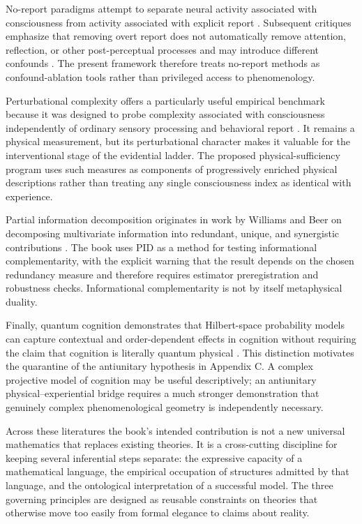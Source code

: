 No-report paradigms attempt to separate neural activity associated with consciousness from activity associated with explicit report \cite{tsuchiya2015NoReport}. Subsequent critiques emphasize that removing overt report does not automatically remove attention, reflection, or other post-perceptual processes and may introduce different confounds \cite{duman2022NoReport}. The present framework therefore treats no-report methods as confound-ablation tools rather than privileged access to phenomenology.

Perturbational complexity offers a particularly useful empirical benchmark because it was designed to probe complexity associated with consciousness independently of ordinary sensory processing and behavioral report \cite{casali2013PCI}. It remains a physical measurement, but its perturbational character makes it valuable for the interventional stage of the evidential ladder. The proposed physical-sufficiency program uses such measures as components of progressively enriched physical descriptions rather than treating any single consciousness index as identical with experience.

Partial information decomposition originates in work by Williams and Beer on decomposing multivariate information into redundant, unique, and synergistic contributions \cite{williams2010PID}. The book uses PID as a method for testing informational complementarity, with the explicit warning that the result depends on the chosen redundancy measure and therefore requires estimator preregistration and robustness checks. Informational complementarity is not by itself metaphysical duality.

Finally, quantum cognition demonstrates that Hilbert-space probability models can capture contextual and order-dependent effects in cognition without requiring the claim that cognition is literally quantum physical \cite{pothos2022QuantumCognition}. This distinction motivates the quarantine of the antiunitary hypothesis in Appendix C. A complex projective model of cognition may be useful descriptively; an antiunitary physical--experiential bridge requires a much stronger demonstration that genuinely complex phenomenological geometry is independently necessary.

Across these literatures the book's intended contribution is not a new universal mathematics that replaces existing theories. It is a cross-cutting discipline for keeping several inferential steps separate: the expressive capacity of a mathematical language, the empirical occupation of structures admitted by that language, and the ontological interpretation of a successful model. The three governing principles are designed as reusable constraints on theories that otherwise move too easily from formal elegance to claims about reality.
